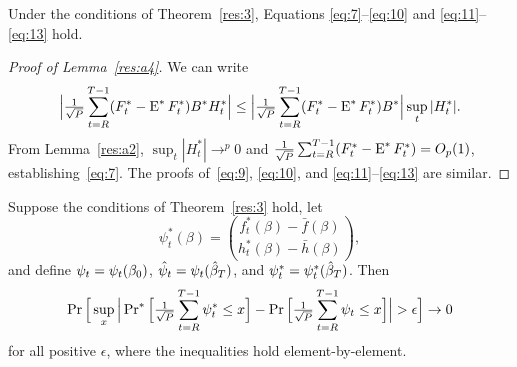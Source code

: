 \documentclass[12pt,fleqn]{article}
\begin{document}
\begin{lema}\label{res:a4}
  Under the conditions of Theorem~\ref{res:3}, Equations
  \eqref{eq:7}--\eqref{eq:10} and \eqref{eq:11}--\eqref{eq:13} hold.
\end{lema}

\begin{proof}[Proof of Lemma~\ref{res:a4}]
We can write
\begin{equation*}
  \Big\lvert \WesA[*] \Big\rvert \leq
  \Big\lvert \oclt{t} (F_t^* - \E^* F^*_t) B^* \Big\rvert
  \sup_t | H_t^* |.
\end{equation*}
From Lemma~\ref{res:a2}, $\sup_t | H_t^* | \to^p 0$ and $\oclt{t}
(F_t^* - \E^* F_t^*) = O_p(1)$, establishing~\eqref{eq:7}.  The proofs
of~\eqref{eq:9}, \eqref{eq:10}, and \eqref{eq:11}--\eqref{eq:13} are
similar.
\end{proof}

\begin{lema}\label{res:a3}
  Suppose the conditions of Theorem~\ref{res:3} hold, let
  \[\psi_t^{*}(\beta) =
  \binom{f_t^{*}(\beta) - \bar{f}(\beta)}{h_t^{*}(\beta) - \bar h(\beta)},\]
  and define $\psi_t = \psi_t(\btrue)$, $\hat\psi_t = \psi_t(\btrue[*])$, and
  $\psi_t^* = \psi_t^*(\btrue[*])$.  Then
  \begin{equation}\label{eq:1}
    \pr\Big[\sup_x \Big| \pr^{*}\Big[ \oclt{t} \psi_{t}^{*}
    \leq x \Big] - \pr\Big[ \oclt{t} \psi_{t}
    \leq x \Big] \Big| > \epsilon \Big] \to 0
  \end{equation}
  for all positive $\epsilon$, where the inequalities hold element-by-element.
\end{lema}
\end{document}
